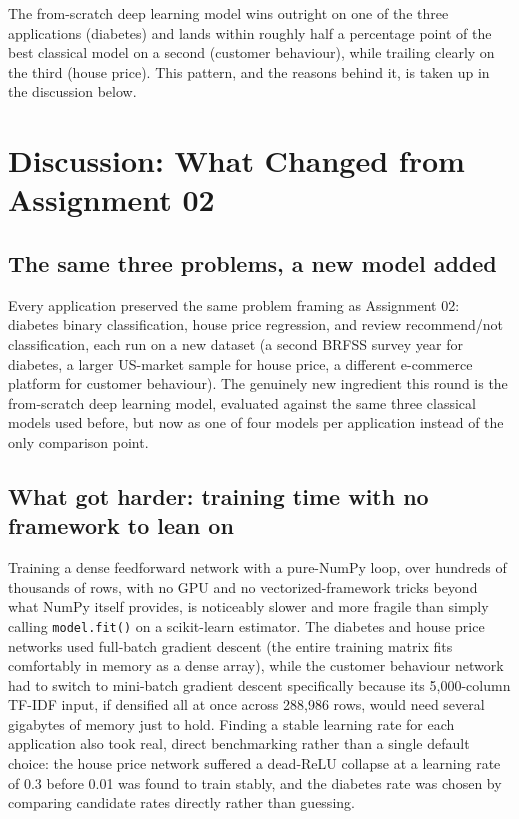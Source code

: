 \documentclass[11pt]{article}
\newcommand{\code}[1]{\texttt{#1}}
\begin{document}
The from-scratch deep learning model wins outright on one of the three applications
(diabetes) and lands within roughly half a percentage point of the best classical model on
a second (customer behaviour), while trailing clearly on the third (house price). This
pattern, and the reasons behind it, is taken up in the discussion below.

\section{Discussion: What Changed from Assignment 02}
\label{sec:discussion}

\subsection{The same three problems, a new model added}

Every application preserved the same problem framing as Assignment 02: diabetes binary
classification, house price regression, and review recommend/not classification, each run
on a new dataset (a second BRFSS survey year for diabetes, a larger US-market sample for
house price, a different e-commerce platform for customer behaviour). The genuinely new
ingredient this round is the from-scratch deep learning model, evaluated against the same
three classical models used before, but now as one of four models per application instead
of the only comparison point.

\subsection{What got harder: training time with no framework to lean on}

Training a dense feedforward network with a pure-NumPy loop, over hundreds of thousands of
rows, with no GPU and no vectorized-framework tricks beyond what NumPy itself provides, is
noticeably slower and more fragile than simply calling \code{model.fit()} on a scikit-learn
estimator. The diabetes and house price networks used full-batch gradient descent (the
entire training matrix fits comfortably in memory as a dense array), while the customer
behaviour network had to switch to mini-batch gradient descent specifically because its
5,000-column TF-IDF input, if densified all at once across 288,986 rows, would need several
gigabytes of memory just to hold. Finding a stable learning rate for each application also
took real, direct benchmarking rather than a single default choice: the house price network
suffered a dead-ReLU collapse at a learning rate of 0.3 before 0.01 was found to train
stably, and the diabetes rate was chosen by comparing candidate rates directly rather than
guessing.
\end{document}
